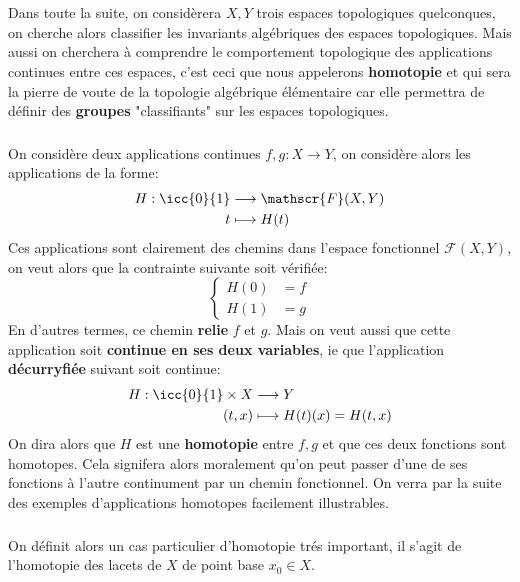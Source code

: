 \documentclass{report}
\begin{document}
\chapter*{}
Dans toute la suite, on considèrera \(X, Y\) trois espaces topologiques quelconques, on cherche alors classifier les invariants algébriques des espaces topologiques. Mais aussi on cherchera à comprendre le comportement topologique des applications continues entre ces espaces, c'est ceci que nous appelerons \textbf{homotopie} et qui sera la pierre de voute de la topologie algébrique élémentaire car elle permettra de définir des \textbf{groupes} "classifiants" sur les espaces topologiques.\<

\subsection*{}
On considère deux applications continues \(f, g : X \longrightarrow Y\), on considère alors les applications de la forme:
\[
   \begin{aligned}
      H : \icc{0}{1} &\longrightarrow \mathscr{F}(X, Y)\\
      t &\longmapsto H(t)
   \end{aligned}
\]
Ces applications sont clairement des chemins dans l'espace fonctionnel \(\mathscr{F}(X, Y)\), on veut alors que la contrainte suivante soit vérifiée:
\[
   \begin{cases}
      H(0) &= f\\
      H(1) &= g
   \end{cases}
\]
En d'autres termes, ce chemin \textbf{relie} \(f\) et \(g\). Mais on veut aussi que cette application soit \textbf{continue en ses deux variables}, ie que l'application \textbf{décurryfiée} suivant soit continue:
\[
   \begin{aligned}
      H : \icc{0}{1} \times X &\longrightarrow Y\\
      (t, x) &\longmapsto H(t)(x) = H(t, x)
   \end{aligned}
\]
On dira alors que \(H\) est une \textbf{homotopie} entre \(f, g\) et que ces deux fonctions sont homotopes. Cela signifera alors moralement qu'on peut passer d'une de ses fonctions à l'autre continument par un chemin fonctionnel. On verra par la suite des exemples d'applications homotopes facilement illustrables.

\subsection*{}
On définit alors un cas particulier d'homotopie trés important, il s'agit de l'homotopie des lacets de \(X\) de point base \(x_0 \in X\).
\end{document}
